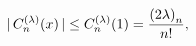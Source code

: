 \[|\mathop{C^{(\lambda)}_{n}\/}\nolimits\!\left(x\right)|\leq\mathop{C^{(\lambda%
)}_{n}\/}\nolimits\!\left(1\right)=\frac{\left(2\lambda\right)_{n}}{n!},\]